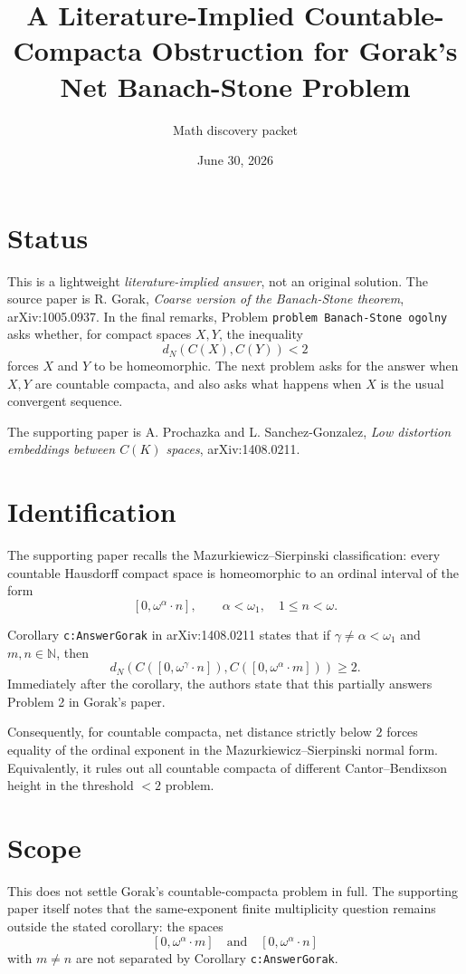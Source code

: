 \documentclass[11pt]{article}
\title{A Literature-Implied Countable-Compacta Obstruction for Gorak's Net Banach-Stone Problem}
\author{Math discovery packet}
\date{June 30, 2026}
\newcommand{\omegaone}{\omega_1}
\newcommand{\Natural}{\mathbb{N}}
\begin{document}
\maketitle

\section{Status}

This is a lightweight \emph{literature-implied answer}, not an original
solution.  The source paper is R. Gorak, \emph{Coarse version of the
Banach-Stone theorem}, arXiv:1005.0937.
In the final remarks, Problem \texttt{problem Banach-Stone ogolny} asks
whether, for compact spaces \(X,Y\), the inequality
\[
  d_N(C(X),C(Y))<2
\]
forces \(X\) and \(Y\) to be homeomorphic.  The next problem asks for the
answer when \(X,Y\) are countable compacta, and also asks what happens when
\(X\) is the usual convergent sequence.

The supporting paper is A. Prochazka and L. Sanchez-Gonzalez, \emph{Low
distortion embeddings between \(C(K)\) spaces}, arXiv:1408.0211.

\section{Identification}

The supporting paper recalls the Mazurkiewicz--Sierpinski classification:
every countable Hausdorff compact space is homeomorphic to an ordinal interval
of the form
\[
  [0,\omega^\alpha\cdot n],
  \qquad \alpha<\omegaone,\quad 1\leq n<\omega.
\]

Corollary \texttt{c:AnswerGorak} in arXiv:1408.0211 states that if
\(\gamma\neq \alpha<\omegaone\) and \(m,n\in\Natural\), then
\[
  d_N\!\left(C([0,\omega^\gamma\cdot n]),
             C([0,\omega^\alpha\cdot m])\right)\geq 2.
\]
Immediately after the corollary, the authors state that this partially answers
Problem 2 in Gorak's paper.

Consequently, for countable compacta, net distance strictly below \(2\)
forces equality of the ordinal exponent in the
Mazurkiewicz--Sierpinski normal form.  Equivalently, it rules out all
countable compacta of different Cantor--Bendixson height in the threshold
\(<2\) problem.

\section{Scope}

This does not settle Gorak's countable-compacta problem in full.  The
supporting paper itself notes that the same-exponent finite multiplicity
question remains outside the stated corollary: the spaces
\[
  [0,\omega^\alpha\cdot m]
  \quad\text{and}\quad
  [0,\omega^\alpha\cdot n]
\]
with \(m\neq n\) are not separated by Corollary \texttt{c:AnswerGorak}.
\end{document}
